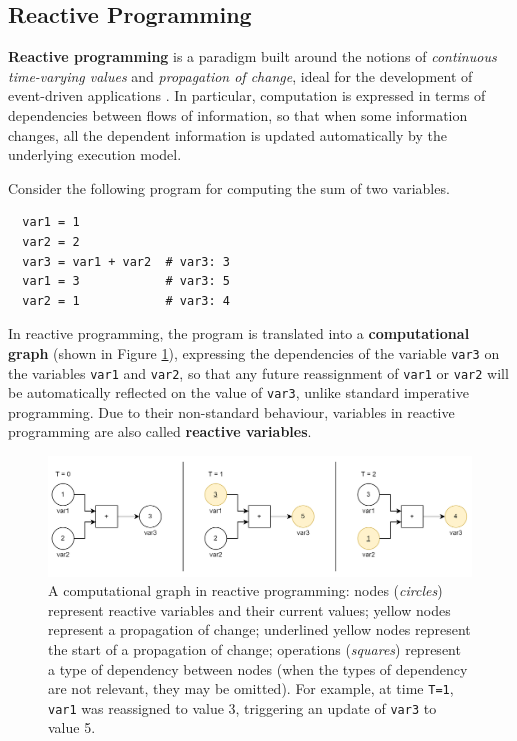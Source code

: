 
\subsection{Reactive Programming}
\label{section:background:concepts:reactive-programming}

\textbf{Reactive programming} is a paradigm built around the notions of
\textit{continuous time-varying values} and \textit{propagation of change},
ideal for the development of event-driven applications
\cite{ReactiveProgramming}. In particular, computation is expressed in terms of
dependencies between flows of information, so that when some information
changes, all the dependent information is updated automatically by the
underlying execution model.

Consider the following program for computing the sum of two variables.

\begin{lstlisting}
  var1 = 1
  var2 = 2
  var3 = var1 + var2  # var3: 3
  var1 = 3            # var3: 5
  var2 = 1            # var3: 4
\end{lstlisting}

In reactive programming, the program is translated into a \textbf{computational
graph} (shown in Figure \ref{figure:dependency-graph}), expressing the
dependencies of the variable \texttt{var3} on the variables \texttt{var1} and
\texttt{var2}, so that any future reassignment of \texttt{var1} or
\texttt{var2} will be automatically reflected on the value of \texttt{var3},
unlike standard imperative programming. Due to their non-standard behaviour,
variables in reactive programming are also called \textbf{reactive variables}.

\begin{figure}[h]
  \centering
  \includegraphics[width=\textwidth]{resources/figures/dependency-graph.png}
  \caption{
    A computational graph in reactive programming: nodes (\textit{circles})
    represent reactive variables and their current values; yellow nodes
    represent a propagation of change; underlined yellow nodes represent the
    start of a propagation of change; operations (\textit{squares}) represent a
    type of dependency between nodes (when the types of dependency are not
    relevant, they may be omitted). For example, at time \texttt{T=1},
    \texttt{var1} was reassigned to value 3, triggering an update of
    \texttt{var3} to value 5.
  }
  \label{figure:dependency-graph}
\end{figure}

